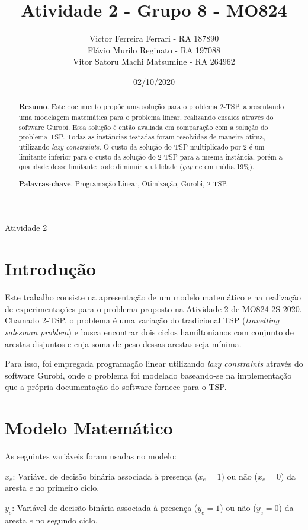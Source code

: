 \documentclass{TEMA}
\title{Atividade 2 - Grupo 8 - MO824}
\author{
    Victor Ferreira Ferrari      - RA 187890\\
    Flávio Murilo Reginato       - RA 197088\\
    Vitor Satoru Machi Matsumine - RA 264962\\
}
\date{02/10/2020}
\begin{document}
\criartitulo

%
{Atividade 2}


\begin{abstract}

{\bf Resumo}. Este documento propõe uma solução para o problema 2-TSP, apresentando uma modelagem matemática para o problema linear, realizando ensaios através do software Gurobi. Essa solução é então avaliada em comparação com a solução do problema TSP. Todas as instâncias testadas foram resolvidas de maneira ótima, utilizando \textit{lazy constraints}. O custo da solução do TSP multiplicado por 2 é um limitante inferior para o custo da solução do 2-TSP para a mesma instância, porém a qualidade desse limitante pode diminuir a utilidade (\textit{gap} de em média 19\%).

{\bf Palavras-chave}. Programação Linear, Otimização, Gurobi, 2-TSP.

\end{abstract}

\section{Introdução}

    Este trabalho consiste na apresentação de um modelo matemático e na realização de experimentações para o problema proposto na Atividade 2 de MO824 2S-2020.
    Chamado 2-TSP, o problema é uma variação do tradicional TSP (\textit{travelling salesman problem}) e busca encontrar dois ciclos hamiltonianos com conjunto de arestas disjuntos e cuja soma de peso dessas arestas seja mínima.
    
    Para isso, foi empregada programação linear utilizando \textit{lazy constraints} através do software Gurobi, onde o problema foi modelado baseando-se na implementação que a própria documentação do software fornece para o TSP.

\section{Modelo Matemático}
    As seguintes variáveis foram usadas no modelo:
    
    $x_{e}$: Variável de decisão binária associada à presença ($x_e = 1$) ou não ($x_e = 0$) da aresta $e$ no primeiro ciclo.
    
    $y_{e}$: Variável de decisão binária associada à presença ($y_e = 1$) ou não ($y_e = 0$) da aresta $e$ no segundo ciclo.\\
    
\end{document}
